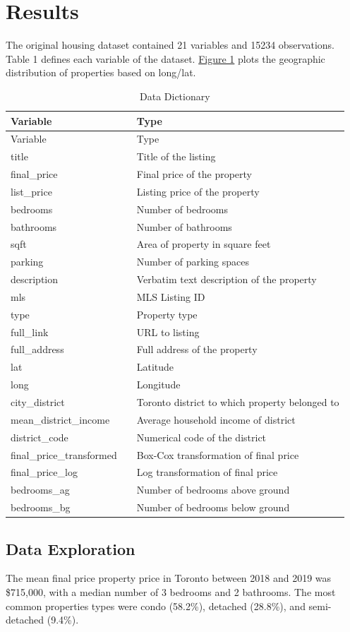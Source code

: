 \documentclass[11pt,]{article}
\begin{document}
\hypertarget{results}{%
\section{Results}\label{results}}

The original housing dataset contained 21 variables and 15234
observations. Table 1 defines each variable of the dataset.
\hyperref[sec:map]{Figure 1} plots the geographic distribution of
properties based on long/lat.

\begin{longtable}[]{@{}lll@{}}
\caption{Data Dictionary}\tabularnewline
\toprule
Variable & & Type\tabularnewline
\midrule
\endfirsthead
\toprule
Variable & & Type\tabularnewline
\midrule
\endhead
title & & Title of the listing\tabularnewline
final\_price & & Final price of the property\tabularnewline
list\_price & & Listing price of the property\tabularnewline
bedrooms & & Number of bedrooms\tabularnewline
bathrooms & & Number of bathrooms\tabularnewline
sqft & & Area of property in square feet\tabularnewline
parking & & Number of parking spaces\tabularnewline
description & & Verbatim text description of the property\tabularnewline
mls & & MLS Listing ID\tabularnewline
type & & Property type\tabularnewline
full\_link & & URL to listing\tabularnewline
full\_address & & Full address of the property\tabularnewline
lat & & Latitude\tabularnewline
long & & Longitude\tabularnewline
city\_district & & Toronto district to which property belonged
to\tabularnewline
mean\_district\_income & & Average household income of
district\tabularnewline
district\_code & & Numerical code of the district\tabularnewline
final\_price\_transformed & & Box-Cox transformation of final
price\tabularnewline
final\_price\_log & & Log transformation of final price\tabularnewline
bedrooms\_ag & & Number of bedrooms above ground\tabularnewline
bedrooms\_bg & & Number of bedrooms below ground\tabularnewline
\bottomrule
\end{longtable}

\hypertarget{data-exploration}{%
\subsection{Data Exploration}\label{data-exploration}}

The mean final price property price in Toronto between 2018 and 2019 was
\$715,000, with a median number of 3 bedrooms and 2 bathrooms. The most
common properties types were condo (58.2\%), detached (28.8\%), and
semi-detached (9.4\%).
\end{document}

